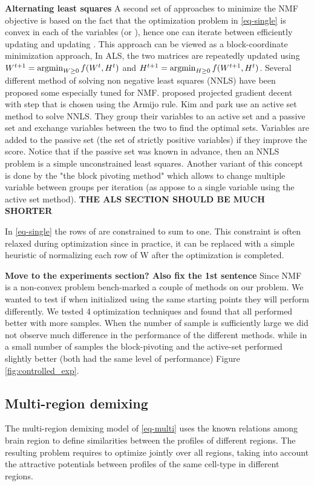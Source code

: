 {\bf{Alternating least squares}} A second set of approaches to minimize the NMF objective is based on the fact that the optimization problem in \eqref{eq-single} is convex in each of the variables \W (or \Htext), hence one can iterate between efficiently updating \W and updating \Htext. This approach can be viewed as a block-coordinate minimization approach, In ALS, the two matrices are  repeatedly updated using $ W^{t+1} = \argmin_{W \geq 0 } f(W^t, H^t)$ and $H^{t+1} = \argmin_{H \geq 0 } f(W^{t+1},H^t)$. Several different method of solving non negative least squares (NNLS) have been proposed some especially tuned for NMF. \citet{lin2007projected} proposed projected gradient decent with step that is chosen using the Armijo rule. 
Kim and park \cite{kim2008activeset,kim2011fast} use an active set method to solve NNLS. They group their variables to an active set and a passive set and 
exchange variables between the two to find the optimal sets. Variables are added to the passive set (the set of strictly positive variables) if they improve the score. Notice that if the passive set was known in advance, then an NNLS problem is a simple unconstrained least squares. Another variant of this concept is done by the "the block pivoting method" which allows to change multiple variable between groups per iteration (as appose to a single variable using the active set method). {\bf{THE ALS SECTION SHOULD BE MUCH SHORTER}}

In \eqref{eq-single} the rows of \W are constrained to sum to one. This constraint is often relaxed during optimization since in practice, it can be replaced with a simple heuristic of normalizing each row of W after the optimization is completed. 

{\bf{Move to the experiments section? Also fix the 1st sentence}} Since NMF is a non-convex problem bench-marked a couple of methods on our problem. We wanted to test if when initialized using the same starting points they will perform differently. We tested 4 optimization techniques and found that all performed better with more samples. When the number of sample is sufficiently large we did not observe much difference in the performance of the different methods. while in a small number of samples the block-pivoting and the active-set performed slightly better (both had the same level of performance) Figure \ref{fig:controlled_exp}.

\subsection{Multi-region demixing}
The multi-region demixing model of \eqref{eq-multi} uses the known relations among brain region to define similarities between the profiles of different regions. The resulting problem requires to optimize jointly over all regions, taking into account the attractive potentials between profiles of the same cell-type in different regions. 

